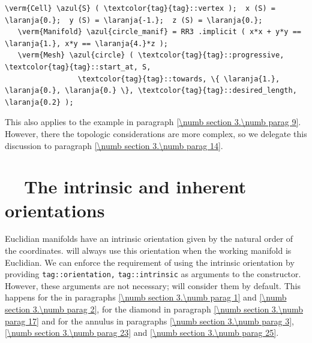 \begin{Verbatim}[commandchars=\\\{\},formatcom=\small\tt,
   baselinestretch=0.94,framesep=2mm                     ]
   \verm{Cell} \azul{S} ( \textcolor{tag}{tag}::vertex );  x (S) = \laranja{0.};  y (S) = \laranja{-1.};  z (S) = \laranja{0.};
   \verm{Manifold} \azul{circle_manif} = RR3 .implicit ( x*x + y*y == \laranja{1.}, x*y == \laranja{4.}*z );
   \verm{Mesh} \azul{circle} ( \textcolor{tag}{tag}::progressive, \textcolor{tag}{tag}::start_at, S,
                 \textcolor{tag}{tag}::towards, \{ \laranja{1.}, \laranja{0.}, \laranja{0.} \}, \textcolor{tag}{tag}::desired_length, \laranja{0.2} );
\end{Verbatim}

This also applies to the example in paragraph \ref{\numb section 3.\numb parag 9}.
However, there the topologic considerations are more complex, so we delegate this
discussion to paragraph \ref{\numb section 3.\numb parag 14}.


\section{~~The intrinsic and inherent orientations}\label{\numb section 3.\numb parag 13}

Euclidian manifolds have an intrinsic orientation given by the natural order of the
coordinates.
{\ManiFEM} will always use this orientation when the working manifold is Euclidian.
We can enforce the requirement of using the intrinsic orientation by providing
{\small\tt\textcolor{tag}{tag}::orientation,} {\small\tt\textcolor{tag}{tag}::intrinsic}
as arguments to the {\small\tt{}} constructor.
However, these arguments are not necessary; {\maniFEM} will consider them by default.
This happens for the {\small\tt{}} in paragraphs \ref{\numb section 3.\numb parag 1} and
\ref{\numb section 3.\numb parag 2}, for the diamond in
paragraph \ref{\numb section 3.\numb parag 17} and for the annulus in paragraphs
\ref{\numb section 3.\numb parag 3}, \ref{\numb section 3.\numb parag 23}
and \ref{\numb section 3.\numb parag 25}.

